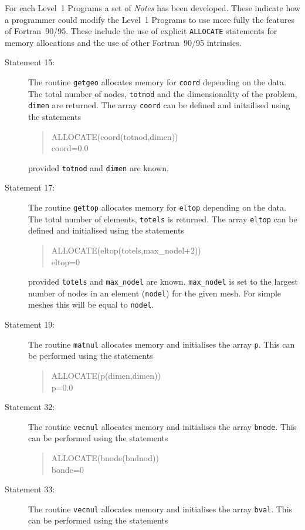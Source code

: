 For each Level~1 Programs  a set of {\it Notes} has been developed. 
These indicate how a programmer could modify the Level~1 Programs to use 
more fully the features of Fortran~90/95. These include the use of
explicit {\tt ALLOCATE} statements for memory allocations and the use
of other Fortran~90/95 intrinsics.
\begin{description}
%
\item[Statement 15:] The routine {\tt getgeo} allocates memory for {\tt coord} depending
on the data. The total number of nodes, {\tt totnod} and the dimensionality
of the problem, {\tt dimen} are returned. 
The array {\tt coord} can be defined and initailised using the statements 
\begin{quote}
\source
ALLOCATE(coord(totnod,dimen))\\
coord=0.0
\end{quote}
provided {\tt totnod} and {\tt dimen} are known.
%
\item[Statement 17:] The routine {\tt gettop} allocates memory for {\tt eltop}
depending on the data. The total number of elements, {\tt totels} is returned.
The array {\tt eltop} can be defined and initialised using the statements
\begin{quote}
\source
ALLOCATE(eltop(totels,max\_nodel+2))\\
eltop=0
\end{quote}
provided {\tt totels} and {\tt max\_nodel} are known. {\tt max\_nodel} is set to
the largest number of nodes in an element ({\tt nodel}) for the given mesh. For
simple meshes this will be equal to {\tt nodel}.
%
\item[Statement 19:] The routine {\tt matnul} allocates memory and initialises
the array {\tt p}. This can be performed using the statements
\begin{quote}
\source
ALLOCATE(p(dimen,dimen))\\
p=0.0
\end{quote}
\item[Statement 32:] The routine {\tt vecnul} allocates memory and initialises
the array {\tt bnode}. This can be performed using the statements
\begin{quote}
\source
ALLOCATE(bnode(bndnod))\\
bonde=0
\end{quote}
\item[Statement 33:]  The routine {\tt vecnul} allocates memory and initialises
the array {\tt bval}. This can be performed using the statements
\begin{quote}

\end{quote}
\end{description}
